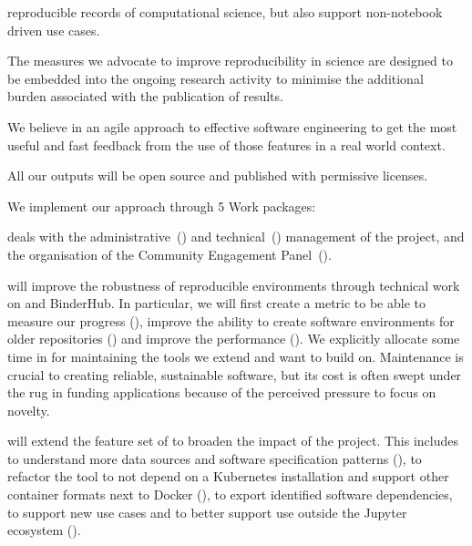 \begin{compactenum}
  reproducible records of computational science, but also support non-notebook
  driven use cases.
\item The measures we advocate to improve reproducibility in science are
  designed to be embedded into the ongoing research activity to minimise the
  additional burden associated with the publication of results.
\item We believe in an agile approach to effective software engineering to get
  the most useful and fast feedback from the use of those features in a real
  world context.
\item All our outputs will be open source and published with permissive
  licenses.
\end{compactenum}


\medskip
\noindent We implement our approach through 5 Work packages:

{} deals with the administrative~()
and technical~() management of the
project, and the organisation of the Community Engagement
Panel~().

     will improve the robustness of reproducible
    environments through technical work on \repotodocker{} and BinderHub. In
    particular, we will first create a metric to be able to measure our progress
    (), improve the ability to create
    software environments for older repositories
    () and improve the
    performance (). We
    explicitly allocate some time in  for
    maintaining the tools we extend and want to build on. Maintenance is crucial
    to creating reliable, sustainable software, but its cost is often swept
    under the rug in funding applications because of the perceived pressure to
    focus on novelty.

     will extend the feature set of \repotodocker{} to broaden
    the impact of the project. This
    includes to understand more data sources and software specification patterns
    (), to refactor the tool to not depend on a
    Kubernetes installation and support other container formats next to Docker
    (), to export identified software dependencies,
    to support new use cases and to
    better support use outside the Jupyter ecosystem ().

